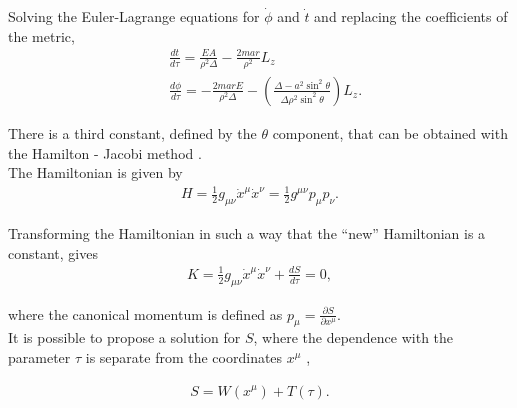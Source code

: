 Solving the Euler-Lagrange equations for $\dot{\phi}$ and $\dot{t}$ and replacing the coefficients of the metric,
\begin{align}
	&\frac{dt}{d\tau} = \frac{EA}{\rho^2\Delta } - \frac{2mar}{\rho^2} L_z\\
	\label{eq: dphidtkerr}
	&\frac{d\phi}{d\tau} = -\frac{2marE}{\rho^2 \Delta} - \left(\frac{\Delta - a^2\sin^2\theta}{\Delta\rho^2\sin^2\theta}\right)L_z.
\end{align}

There is a third constant, defined by the $\theta$ component, that can be obtained with the Hamilton - Jacobi method \cite{Bambi, Straumann}. \\

The Hamiltonian is given by
\begin{align}
	H = \frac{1}{2}g_{\mu\nu}\dot{x}^\mu\dot{x}^\nu = \frac{1}{2}g^{\mu\nu}p_\mu p_\nu.
\end{align}

Transforming the Hamiltonian in such a way that the ``new'' Hamiltonian is a constant,
gives
\begin{align*}
	K = \frac{1}{2}g_{\mu\nu}\dot{x}^\mu\dot{x}^\nu + \frac{dS}{d\tau} = 0,
\end{align*} 

where the canonical momentum is defined as $p_\mu = \frac{\partial S}{\partial x^\mu}$.\\

It is possible to propose a solution for $S$, where the dependence with the parameter $\tau$ is separate from the coordinates $x^\mu$ \cite{Straumann},

\begin{align*}
	S = W(x^\mu) + T(\tau).
\end{align*} 

